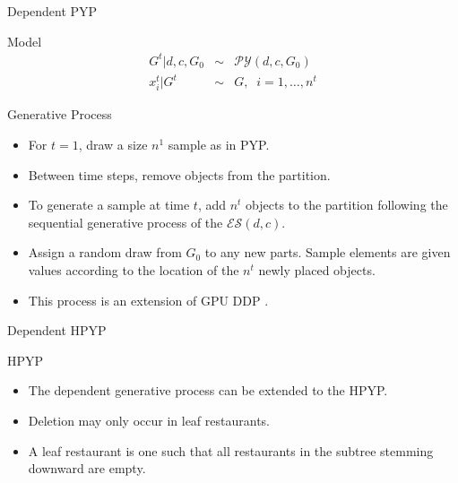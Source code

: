 \documentclass{beamer}
\newcommand{\PY}{\mathcal{P}\mathcal{Y}}
\newcommand{\ES}{\mathcal{E}\mathcal{S}}
\begin{document}
\begin{frame}[t]{Dependent PYP}
	\begin{block}{Model}
		\vspace{-.5cm}
		\begin{eqnarray*}
			G^t | d,c, G_0 &\sim& \PY(d,c,G_0) \\
			x^t_i | G^t &\sim& G, \;\; i=1,\ldots,n^t
		\end{eqnarray*}
	\end{block}

	\begin{block}{Generative Process}
		\begin{itemize}
			\item For $t = 1$, draw a size  $n^1$ sample as in PYP.
			\item Between time steps, remove objects from the partition.
			\item To generate a sample at time $t$, add $n^t$ objects to the partition following the sequential generative process of the $\ES(d,c)$.
			\item Assign a random draw from $G_0$ to any new parts.  Sample elements are given values according to the location of the $n^t$ newly placed objects.
			\item This process is an extension of GPU DDP \cite{Caron2007}.
		\end{itemize}
	\end{block}
\end{frame}

\begin{frame}[t]{Dependent HPYP}
	
	\begin{block}{HPYP}
		\begin{itemize}
			\item The dependent generative process can be extended to the HPYP.
			\item Deletion may only occur in leaf restaurants.
			\item A leaf restaurant is one such that all restaurants in the subtree stemming downward are empty.
		\end{itemize}

	\end{block}
\end{frame}
\end{document}
